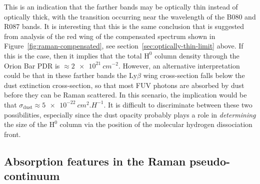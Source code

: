 \documentclass[useAMS, usenatbib, a4paper]{mnras}
\newcommand*\chem[1]{\ensuremath{\mathrm{#1}}}
\newcommand\lyb{\ensuremath{\text{Ly}\beta}}
\begin{document}
This is an indication that the farther bands may be optically thin instead of optically thick,
with the transition occurring near the wavelength of the B080 and R087 bands.
It is interesting that this is the same conclusion that is suggested
from analysis of the red wing of the compensated spectrum shown in Figure~\ref{fig:raman-compensated}, see section~\ref{sec:optically-thin-limit} above.
If this is the case, then it implies that the total \chem{H^0} column density through
the Orion Bar PDR is \(\approx \SI{2e21}{cm^{-2}}\).
However, an alternative interpretation could be that in these farther bands
the \lyb{} wing cross-section falls below the dust extinction cross-section,
so that most FUV photons are absorbed by dust before they can be Raman scattered.
In this scenario, the implication would be that \(\sigma_{\text{dust}} \approx \SI{5e-22}{cm^2.H^{-1}}\).
It is difficult to discriminate between these two possibilities,
especially since the dust opacity probably plays a role in \emph{determining}
the size of the \chem{H^0} column via the position of
the molecular hydrogen dissociation front.

\subsection{Absorption features in the Raman pseudo-continuum}
\label{sec:absorpt-feat-raman}
\end{document}

